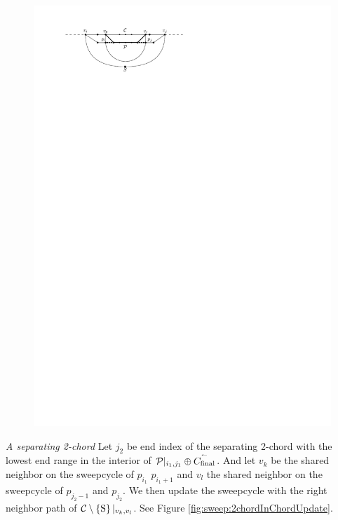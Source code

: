     \begin{figure}[h]
      \centering
      \includegraphics[scale=1]{unifiedAlgo/img/sweep/chordUpdate}
      \caption{}
      \label{fig:sweep:chordUpdate}
    \end{figure}

    \emph{A separating 2-chord}
      Let $j_2$ be end index of the separating 2-chord with the lowest end range in the interior of $\mathcal{P}|_{i_1, j_1} \oplus \accentset{\leftharpoonup}{{C_\text{final}}}$. And let $v_k$ be the shared neighbor on the sweepcycle of $p_{i_1}$ $p_{i_1 +1}$ and $v_l$ the shared neighbor on the sweepcycle  of $p_{j_2 -1}$ and $p_{j_2}$.
      We then update the sweepcycle with the right neighbor path of $\mathcal{C} \setminus \left\lbrace {\mathrm{S}} \right\rbrace|_{v_k, v_l}$. See Figure \ref{fig:sweep:2chordInChordUpdate}.

